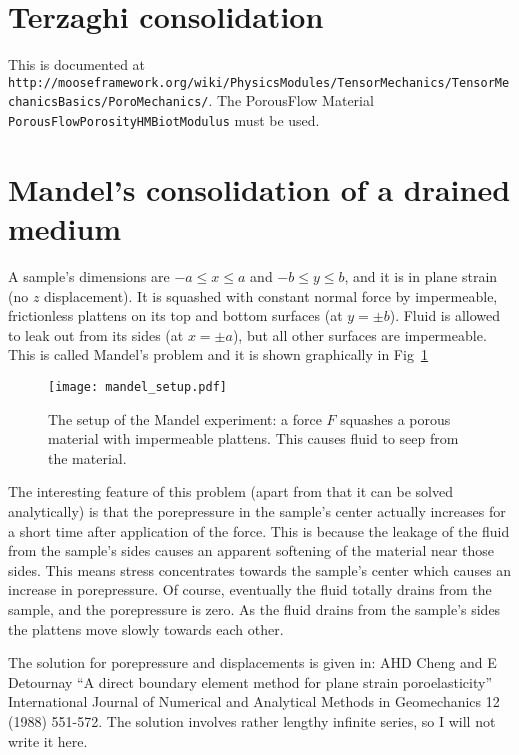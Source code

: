 \section{Terzaghi consolidation}

This is documented at {\tt
  http://mooseframework.org/wiki/PhysicsModules/TensorMechanics/TensorMechanicsBasics/PoroMechanics/}.
The PorousFlow Material {\tt PorousFlowPorosityHMBiotModulus} must be used.

\section{Mandel's consolidation of a drained medium}

A sample's dimensions are $-a \leq x \leq a$ and $-b \leq y \leq b$,
and it is in plane strain (no $z$ displacement).  It is squashed with
constant normal force by impermeable, frictionless plattens on its top
and bottom surfaces (at $y = \pm b$).  Fluid is allowed to leak out
from its sides (at $x = \pm a$), but all other surfaces are
impermeable.  This is called Mandel's problem and it is shown
graphically in Fig~\ref{mandel_setup.fig}

\begin{figure}[htb]
\begin{center}
\texttt{[image: mandel\_setup.pdf]}
\caption{The setup of the Mandel experiment: a force $F$ squashes a
  porous material with impermeable plattens.  This causes fluid to
  seep from the material.}
\label{mandel_setup.fig}
\end{center}
\end{figure}

The interesting feature of this problem (apart from that it can be
solved analytically) is that the porepressure in the sample's center
actually increases for a short time after application of the force.
This is because the leakage of the fluid from the sample's sides
causes an apparent softening of the material near those sides.  This
means stress concentrates towards the sample's center which causes an
increase in porepressure.  Of course, eventually the fluid totally
drains from the sample, and the porepressure is zero.  As the fluid
drains from the sample's sides the plattens move slowly towards each
other.

The solution for porepressure and displacements is given in: AHD Cheng
and E Detournay ``A direct boundary element method for plane strain
poroelasticity'' International Journal of Numerical and Analytical
Methods in Geomechanics 12 (1988) 551-572.  The solution involves
rather lengthy infinite series, so I will not write it here.

